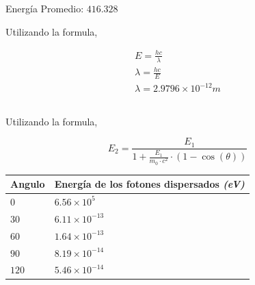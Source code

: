 \documentclass[letterpaper, 12pt]{article}
\newcommand{\bolditalic}[1]{\textbf{\textit{#1}}}
\begin{document}
Energía Promedio: $416.328$

Utilizando la formula,

\begin{equation*}
      \begin{gathered}
            E = \frac{h c}{\lambda} \\
            \lambda = \frac{h c}{E} \\
            \lambda = 2.9796 \times 10^{-12} m
      \end{gathered}
\end{equation*}

\subsection{}

Utilizando la formula,

\begin{equation}
      E_{2} = \frac{E_{1}}{1 + \frac{E_{1}}{m_0 \cdot c^{2}} \cdot (1 - \cos(\theta))}
      \label{eq:E2}
\end{equation}

\begin{table}[H]
      \begin{center}
            \begin{tabularx}{.8\linewidth}{|>{\centering\arraybackslash}X|>{\centering\arraybackslash}X|}
                  \hline
                  Angulo & Energía de los fotones dispersados \bolditalic{(eV)} \\\hline
                  $0$    & $6.56 \times 10^{5}$                                 \\\hline
                  $30$   & $6.11 \times 10^{-13}$                               \\\hline
                  $60$   & $1.64 \times 10^{-13}$                               \\\hline
                  $90$   & $8.19 \times 10^{-14}$                               \\\hline
                  $120$  & $5.46 \times 10^{-14}$                               \\\hline

            \end{tabularx}
      \end{center}
\end{table}

\end{document}
